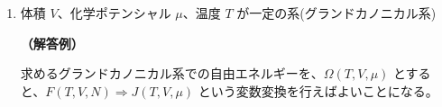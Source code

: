 \documentclass[uplatex,dvipdfmx,a4paper,11pt]{jsarticle}
\newcommand{\diff}{\mathrm d}
\begin{document}
\begin{enumerate}
\begin{enumerate}
\vspace{10pt}
{\bf （解答例）}

内部エネルギーの式は、内部エネルギー $E$ の微小変化 $dE$ を、エントロピー $S$、体積 $V$、および、粒子数 $N$ の微小変化である $\diff S, \diff V, \diff N$ により、
\begin{equation*}
\diff E \leq T \diff S - P \diff V + \mu \diff N
\end{equation*}

これを、$S, V, N$ を独立な変数とする内部エネルギーの関数であると見て、$E(S, V, N)$と書くことにする。
求めるカノニカル系での自由エネルギーは、$T, V, N$ を独立な変数とする関数として $F(T, V, N)$ と書くことができる。
したがって、$E(S, V, N) \Rightarrow F(T, V, N)$ という変数変換を行う必要がある。

積の微分公式から、
\begin{align*}
\diff (TS) = S \diff T + T \diff S \notag \\
\therefore T \diff S = \diff (TS) - S \diff T
\end{align*}
	 	
これを、内部エネルギーの式に代入し、更に変形すると、
\begin{align*}
\diff E \leq \diff (TS) - S \diff T - P \diff V + \mu \diff N \notag \\
\diff (E-TS) \leq -S \diff T - P \diff V + \mu \diff N
\end{align*}

ここで、求めるカノニカル系の自由エネルギーを $F(T,V,N) = E-TS$ として、
\begin{equation*}
\diff F(T,V,N) \leq -S \diff T - P \diff V + \mu \diff N
\end{equation*}
	 	
これで、温度 $T$、体積 $V$、および、粒子数 $N$ を独立変数とするカノニカル系の自由エネルギー（ヘルムホルツエネルギー）の表式が求まった。

なお、独立変数である体積 $V$、粒子数 $N$、温度 $T$ が一定となった場合に右辺が 0 となり、$\diff F \leq 0$ で最小化し、平衡状態で等号が成立する。

\color{black}

\vspace{10pt}
\item
体積 $V$、化学ポテンシャル $\mu$、温度 $T$ が一定の系(グランドカノニカル系)



\vspace{10pt}
{\bf （解答例）}

求めるグランドカノニカル系での自由エネルギーを、$\Omega(T, V, \mu)$ とすると、$F(T, V, N) \Rightarrow J(T, V, \mu)$ という変数変換を行えばよいことになる。


\end{enumerate}
\end{enumerate}
\end{document}
